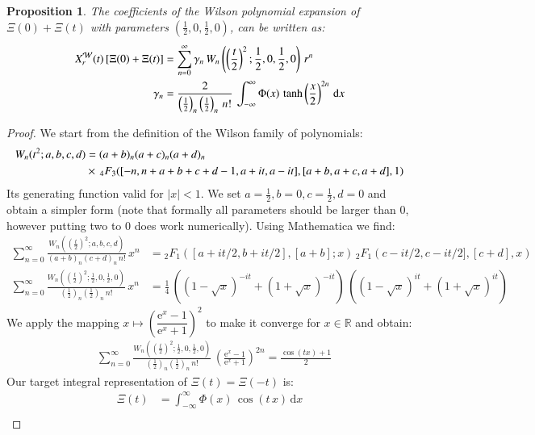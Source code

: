 \documentclass[a4paper,11pt,twoside]{amsart}
\newtheorem{proposition}[theorem]{Proposition}
\newcommand{\verifiedeq}{=}
\newcommand{\defeq}{=}
\newcommand{\verifiedeq}{\stackrel{\checkmark}{=}}
\newcommand{\defeq}{\stackrel{\scriptscriptstyle \textnormal{def}}{=}}
\begin{document}
\begin{proposition}
The coefficients of the Wilson polynomial expansion of $\Xi(0) +\Xi(t)$ with parameters $(\frac12,0,\frac12,0)$, can be written as:   
\begin{align}
X^\mathcal{W}_r(t)\left[\Xi(0)+\Xi(t)\right] &\verifiedeq \sum_{n=0}^\infty \gamma_n\,W_n\left(\left(\frac{t}{2}\right)^2;\frac12,0,\frac12,0\right)\,r^n \\
\gamma_n &\verifiedeq \frac{2}{\left(\frac12\right)_n\left(\frac12\right)_n\,n!}\,\int_{-\infty}^\infty \Phi(x)\,\tanh\left(\frac{x}{2}\right)^{2n}\, \mathrm{d}x \notag
\end{align}
\end{proposition}
\begin{proof}
We start from the definition of the Wilson family of polynomials:
\begin{align}
 W_n(t^2;a,b,c,d) &\defeq (a+b)_n(a+c)_n(a+d)_n\, \\
  &\times\, {}_4F_3([-n, n+ a+b+c+d-1,a+it, a- it], [a+b, a+c, a+d], 1) \notag
\end{align}
Its generating function valid for $|x| < 1$. We set $a=\frac12,b=0,c=\frac12,d=0$ and obtain a simpler form (note that formally all parameters should be larger than $0$, however putting two to $0$ does work numerically). Using Mathematica we find:
\begin{align}
 \sum_{n=0}^\infty \frac{W_n(\left(\frac{t}{2}\right)^2;a,b,c,d)}{(a+b)_n(c+d)_n\,n!}\, x^n &\verifiedeq {}_2F_1\left([a+it/2, b+it/2],[a+b] ;x\right)\,{}_2F_1\left(c-it/2, c-it/2],[c+d],x\right) \\
 \sum_{n=0}^\infty \frac{W_n\left(\left(\frac{t}{2}\right)^2;\frac12,0,\frac12,0\right)}{\left(\frac12\right)_n\left(\frac12\right)_n\,n!}\,x^n&\verifiedeq \frac14\,\left((1-\sqrt{x})^{-it}+(1+\sqrt{x})^{-it}\right)\,\left((1-\sqrt{x})^{it}+(1+\sqrt{x})^{it}\right)
\end{align} 
We apply the mapping $x \mapsto \left(\dfrac{\textrm{e}^x-1}{\textrm{e}^x+1}\right)^2$ to make it converge for $x \in \mathbb{R}$ and obtain: 
\begin{align}
 &\sum_{n=0}^\infty \frac{W_n\left(\left(\frac{t}{2}\right)^2;\frac12,0,\frac12,0\right)}{\left(\frac12\right)_n\left(\frac12\right)_n\,n!}\, \left(\frac{\textrm{e}^x-1}{\textrm{e}^x+1}\right)^{2n} \verifiedeq \frac{\cos(tx)+1}{2}
\end{align}
Our target integral representation of $\Xi(t) = \Xi(-t)$ is:
\begin{align}
 \Xi(t) &\verifiedeq \int_{-\infty}^\infty \Phi(x)\,\cos(t\,x)\, \mathrm{d}x \\

\end{align}
\end{proof}
\end{document}

